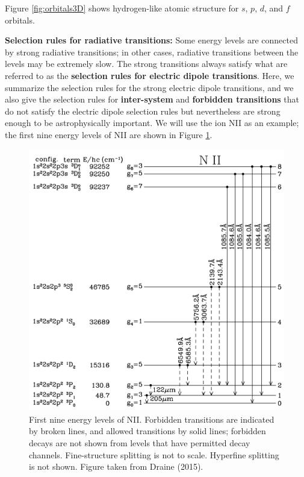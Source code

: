 \documentclass[a4paper,10pt]{article}
\begin{document}
{\noindent}Figure \ref{fig:orbitals3D} shows hydrogen-like atomic structure for $s$, $p$, $d$, and $f$ orbitals.

{\noindent}\textbf{Selection rules for radiative transitions:} Some energy levels are connected by strong radiative transitions; in other cases, radiative transitions between the levels may be extremely slow. The strong transitions always satisfy what are referred to as the \textbf{selection rules for electric dipole transitions}. Here, we summarize the selection rules for the strong electric dipole transitions, and we also give the selection rules for \textbf{inter-system} and \textbf{forbidden transitions} that do not satisfy the electric dipole selection rules but nevertheless are strong enough to be astrophysically important. We will use the ion NII as an example; the first nine energy levels of NII are shown in Figure \ref{fig:NIIlevels}.

\begin{figure}[t]
    \centering
    \includegraphics[width=14cm]{figures/NII_levels.png}
    \caption{\footnotesize{First nine energy levels of NII. Forbidden transitions are indicated by broken lines, and allowed transitions by solid lines; forbidden decays are not shown from levels that have permitted decay channels. Fine-structure splitting is not to scale. Hyperfine splitting is not shown. Figure taken from Draine (2015).}}
    \label{fig:NIIlevels}
\end{figure}
\end{document}
